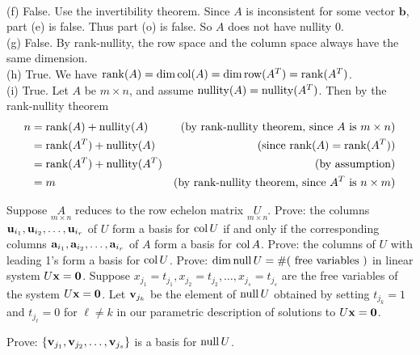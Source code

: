 \begin{solution}
\\
(f) False. Use the invertibility theorem. Since $A$ is inconsistent for some vector $\textbf{b}$, part (e) is false. Thus part (o) is false. So $A$ does not have nullity 0.
\\
(g) 
False. By rank-nullity, the row space and the column space always have the same dimension.
\\
(h) True. We have $\operatorname{rank}(A)=\dim\operatorname{col}(A)=\dim\operatorname{row}(A^T)=\operatorname{rank}(A^T)$. 
\\
(i) True. Let $A$ be $m\times n$, and assume $\operatorname{nullity}(A)=\operatorname{nullity}(A^T)$.  Then by the rank-nullity theorem 
\begin{align*}
n&=\operatorname{rank}(A)+\operatorname{nullity}(A)&\text{(by rank-nullity theorem, since $A$ is $m\times n$)}
\\
&=\operatorname{rank}(A^T)+\operatorname{nullity}(A) &\text{(since $\operatorname{rank}(A)=\operatorname{rank}(A^T)$)}\\
&=\operatorname{rank}(A^T)+\operatorname{nullity}(A^T) &\text{(by assumption)}\\
&=m &\text{(by rank-nullity theorem, since $A^T$ is $n\times m$)}
\end{align*}

\end{solution}
\ii Suppose $\underset{m\times n}{A}$ reduces to the row echelon matrix $\underset{m\times n}{U}$. 
\bb
\ii Prove: the columns ${\mathbf u}_{i_1}, {\mathbf u}_{i_2}, \dots, {\mathbf u}_{i_r}$ of $U$ form a basis for $\operatorname{col} U$ if and only if the corresponding columns ${\mathbf a}_{i_1}, {\mathbf a}_{i_2}, \dots, {\mathbf a}_{i_r}$ of $A$ form a basis for $\operatorname{col} A$. 
\ii Prove: the columns of $U$ with leading 1's form a basis for $\operatorname{col} U$. 
\ii Prove: $\dim \operatorname{null} U=\#(\text{ free variables })$ in linear system $U{\mathbf x}={\mathbf 0}$. 
\ii Suppose $x_{j_1}=t_{j_1}, x_{j_2}=t_{j_2}, \dots, x_{j_s}=t_{j_s}$ are the free variables of the system $U{\mathbf x}={\mathbf 0}$. Let ${\mathbf v}_{j_k}$ be the element of $\operatorname{null} U$ obtained by setting $t_{j_k}=1$ and $t_{j_\ell}=0$ for $\ell\ne k$ in our parametric description of solutions to $U{\mathbf x}={\mathbf 0}$. 

Prove: $\{{\mathbf v}_{j_1}, {\mathbf v}_{j_2}, \dots, {\mathbf v}_{j_s}\}$ is a basis for $\operatorname{null} U$. 

